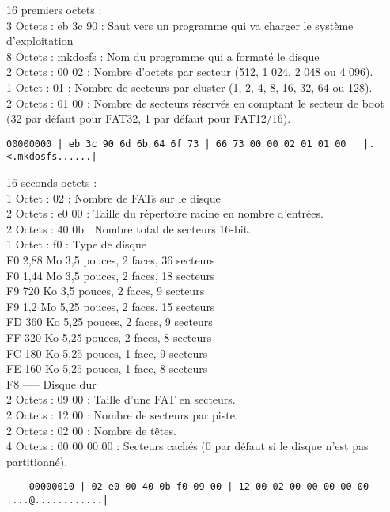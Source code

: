 \documentclass[11pt]{report}
\begin{document}
16 premiers octets : \\
3 Octets : eb 3c 90 : Saut vers un programme qui va charger le système d'exploitation \\
8 Octets : mkdosfs : Nom du programme qui a formaté le disque\\
2 Octets : 00 02 : Nombre d'octets par secteur (512, 1 024, 2 048 ou 4 096). \\
1 Octet : 01 : Nombre de secteurs par cluster (1, 2, 4, 8, 16, 32, 64 ou 128).\\
2 Octets : 01 00 : Nombre de secteurs réservés en comptant le secteur de boot\\
(32 par défaut pour FAT32, 1 par défaut pour FAT12/16).
\begin{verbatim}
00000000 | eb 3c 90 6d 6b 64 6f 73 | 66 73 00 00 02 01 01 00   |.<.mkdosfs......| 
\end{verbatim}

16 seconds octets :\\
1 Octet : 02 : Nombre de FATs sur le disque\\
2 Octets : e0 00 : Taille du répertoire racine en nombre d'entrées.\\
2 Octets : 40 0b : Nombre total de secteurs 16-bit.\\
1 Octet : f0 : Type de disque \\
F0     2,88 Mo    3,5 pouces, 2 faces, 36 secteurs\\
F0     1,44 Mo    3,5 pouces, 2 faces, 18 secteurs\\
F9     720 Ko     3,5 pouces, 2 faces, 9 secteurs\\
F9     1,2 Mo     5,25 pouces, 2 faces, 15 secteurs\\
FD     360 Ko     5,25 pouces, 2 faces, 9 secteurs\\
FF     320 Ko     5,25 pouces, 2 faces, 8 secteurs\\
FC     180 Ko     5,25 pouces, 1 face, 9 secteurs\\
FE     160 Ko     5,25 pouces, 1 face, 8 secteurs\\
F8     -----      Disque dur\\
2 Octets : 09 00 : Taille d'une FAT en secteurs.\\
2 Octets : 12 00 : Nombre de secteurs par piste.\\
2 Octets : 02 00 : Nombre de têtes.\\
4 Octets : 00 00 00 00 : Secteurs cachés (0 par défaut si le disque n'est pas partitionné).
\begin{verbatim}
	00000010 | 02 e0 00 40 0b f0 09 00 | 12 00 02 00 00 00 00 00   |...@............| 
\end{verbatim}
\end{document}
